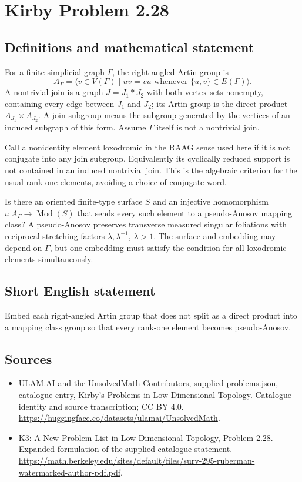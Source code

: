 \documentclass[11pt,a4paper]{article}
\begin{document}
\section*{Kirby Problem 2.28}\label{statement}

\subsection{Definitions and mathematical statement}
For a finite simplicial graph $\Gamma$, the right-angled Artin group is
\[
 A_\Gamma=\langle v\in V(\Gamma)\mid uv=vu\text{ whenever }\{u,v\}\in E(\Gamma)\rangle.
\]
A nontrivial join is a graph $J=J_1*J_2$ with both vertex sets nonempty,
containing every edge between $J_1$ and $J_2$; its Artin group is the direct
product $A_{J_1}\times A_{J_2}$. A join subgroup means the subgroup generated
by the vertices of an induced subgraph of this form. Assume $\Gamma$ itself
is not a nontrivial join.

Call a nonidentity element loxodromic in the RAAG sense used here if it is
not conjugate into any join subgroup. Equivalently its cyclically reduced
support is not contained in an induced nontrivial join. This is the algebraic
criterion for the usual rank-one elements, avoiding a choice of conjugate word.

Is there an oriented finite-type surface $S$ and an injective homomorphism
$\iota:A_\Gamma\to\operatorname{Mod}(S)$ that sends every such element to a
pseudo-Anosov mapping class? A pseudo-Anosov preserves transverse measured
singular foliations with reciprocal stretching factors $\lambda,\lambda^{-1}$,
$\lambda>1$. The surface and embedding may depend on $\Gamma$, but one
embedding must satisfy the condition for all loxodromic elements simultaneously.
\subsection{Short English statement}
Embed each right-angled Artin group that does not split as a direct product into a mapping class group so that every rank-one element becomes pseudo-Anosov.
\subsection{Sources}
\begin{itemize}
\item[S1] ULAM.AI and the UnsolvedMath Contributors, supplied problems.json, catalogue entry, Kirby's Problems in Low-Dimensional Topology. Catalogue identity and source transcription; CC BY 4.0.
\url{https://huggingface.co/datasets/ulamai/UnsolvedMath}.
\item[S2] K3: A New Problem List in Low-Dimensional Topology, Problem 2.28. Expanded formulation of the supplied catalogue statement.
\url{https://math.berkeley.edu/sites/default/files/surv-295-ruberman-watermarked-author-pdf.pdf}.
\end{itemize}
\end{document}
